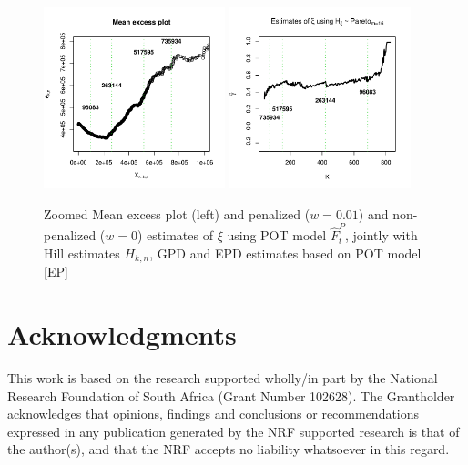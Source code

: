 \documentclass[a4paper,11pt]{article}
\begin{document}
\begin{figure}[hh!]
	\centering
	\includegraphics[width=0.47\textwidth]{thresh_MExcess_zoom_xi_m16.pdf}
	\includegraphics[width=0.47\textwidth]{thresh_xi_m16.pdf}        
	\caption{\small Zoomed Mean excess plot (left) and penalized ($w=0.01$) and non-penalized ($w=0$) estimates of $\xi$ using POT model $\hat{F}^{P}_t$, jointly with Hill estimates $H_{k,n}$, GPD and EPD estimates based on POT model \eqref{EP}} 
\end{figure}


\section{Acknowledgments}  
\label{Sec5}
	\noindent This work is based on the research supported wholly/in part by the National Research Foundation of South Africa (Grant Number 102628). The Grantholder acknowledges that opinions, findings and conclusions or recommendations expressed in any publication generated by the NRF supported research is that of the author(s), and that the NRF accepts no liability whatsoever in this regard. 
\end{document}
